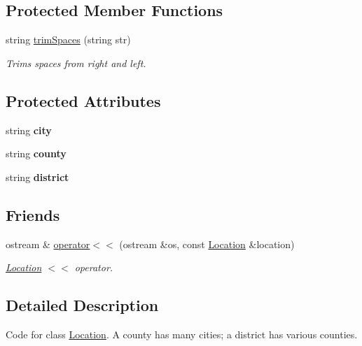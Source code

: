 \subsection*{Protected Member Functions}
\begin{DoxyCompactItemize}
\item 
string \hyperlink{class_location_a0b4be23bfc6e2ea1ed95d80f70a84fbf}{trim\+Spaces} (string str)
\begin{DoxyCompactList}\small\item\em Trims spaces from right and left. \end{DoxyCompactList}\end{DoxyCompactItemize}
\subsection*{Protected Attributes}
\begin{DoxyCompactItemize}
\item 
\hypertarget{class_location_a0179634b6ba4046f74f57949e789abfb}{}string {\bfseries city}\label{class_location_a0179634b6ba4046f74f57949e789abfb}

\item 
\hypertarget{class_location_a648dadbf656ddaff096a36faa271a165}{}string {\bfseries county}\label{class_location_a648dadbf656ddaff096a36faa271a165}

\item 
\hypertarget{class_location_a3739b4e334dfd90923671fb543baef4a}{}string {\bfseries district}\label{class_location_a3739b4e334dfd90923671fb543baef4a}

\end{DoxyCompactItemize}
\subsection*{Friends}
\begin{DoxyCompactItemize}
\item 
ostream \& \hyperlink{class_location_acbdedd349c06b3c398317f9a9a9d3fe8}{operator$<$$<$} (ostream \&os, const \hyperlink{class_location}{Location} \&location)
\begin{DoxyCompactList}\small\item\em \hyperlink{class_location}{Location} $<$$<$ operator. \end{DoxyCompactList}\end{DoxyCompactItemize}


\subsection{Detailed Description}
Code for class \hyperlink{class_location}{Location}. A county has many cities; a district has various counties. 

